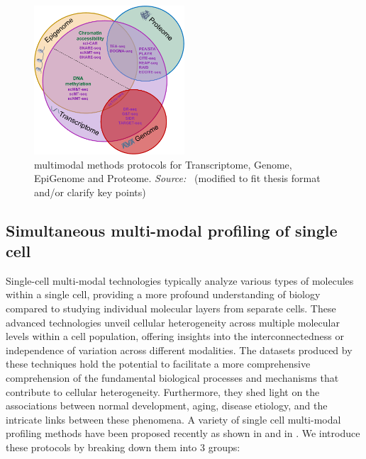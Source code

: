 \begin{figure}[!ht]
	\centering
	\includegraphics[width=0.50\textwidth]{multi-model-methods/fig}
	\vspace{0.1cm}
	\caption[multimodal methods protocols for Transcriptome, Genome, EpiGenome and Proteome]{multimodal methods protocols for Transcriptome, Genome, EpiGenome and Proteome. \emph{Source:~\cite{lee2020single}} (modified to fit thesis format and/or clarify key points)}
	\label{fig:piechart-mulitmodal-methods}
\end{figure}



\subsection{Simultaneous multi-modal profiling of single cell}
\label{background:sec1:mulitmodal}
Single-cell multi-modal technologies typically analyze various types of molecules within a single cell, providing a more profound understanding of biology compared to studying individual molecular layers from separate cells. These advanced technologies unveil cellular heterogeneity across multiple molecular levels within a cell population, offering insights into the interconnectedness or independence of variation across different modalities. The datasets produced by these techniques hold the potential to facilitate a more comprehensive comprehension of the fundamental biological processes and mechanisms that contribute to cellular heterogeneity. Furthermore, they shed light on the associations between normal development, aging, disease etiology, and the intricate links between these phenomena. A variety of single cell multi-modal profiling methods have been proposed recently as shown in  and in . We introduce these protocols by breaking down them into 3 groups:

